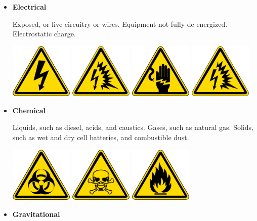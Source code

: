 \documentclass[11pt,a4paper]{article}
\begin{document}
\begin{itemize}
    \item \textbf{Electrical}

    Exposed, or live circuitry or wires. Equipment not fully de-energized. Electrostatic charge.
    \begin{center}
    \includegraphics[width=3cm]{shock}
    \includegraphics[width=3cm]{shock2}
    \includegraphics[width=3cm]{shock3}
    \includegraphics[width=3cm]{shock4}
\end{center}
    \item \textbf{Chemical}

    Liquids, such as diesel, acids, and caustics. Gases, such as natural gas. Solids, such as wet and dry cell batteries, and combustible dust.
    \begin{center}
    \includegraphics[width=3cm]{chemical}
    \includegraphics[width=3cm]{chemical2}
        \includegraphics[width=3cm]{flammable}
\end{center}
    \item \textbf{Gravitational}


\end{itemize}
\end{document}
